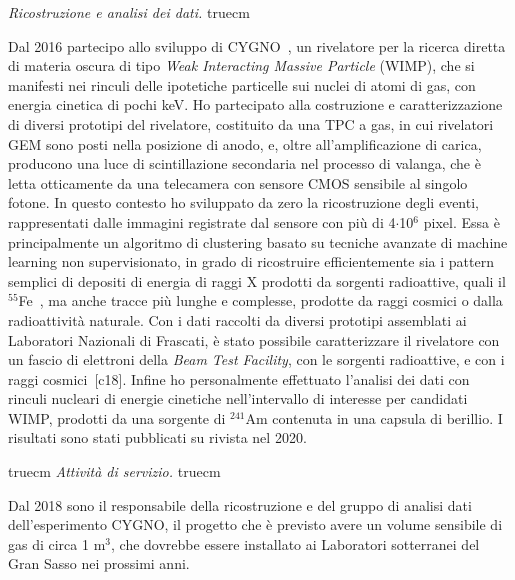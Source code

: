 \documentclass[11pt,twoside,a4paper]{article}
\begin{document}
\textit{Ricostruzione e analisi dei dati.}
 truecm

Dal 2016 partecipo allo sviluppo di CYGNO~\cite{Pinci:2019hhw}, un
rivelatore per la ricerca diretta di materia oscura di tipo
\textit{Weak Interacting Massive Particle} (WIMP), che si manifesti
nei rinculi delle ipotetiche particelle sui nuclei di atomi di gas,
con energia cinetica di pochi keV. Ho partecipato alla costruzione e
caratterizzazione di diversi prototipi del rivelatore, costituito da
una TPC a gas, in cui rivelatori GEM sono posti nella posizione di
anodo, e, oltre all'amplificazione di carica, producono una luce di
scintillazione secondaria nel processo di valanga, che \`e letta
otticamente da una telecamera con sensore CMOS sensibile al singolo
fotone.  In questo contesto ho sviluppato da zero la ricostruzione
degli eventi, rappresentati dalle immagini registrate dal sensore con
pi\`u di 4$\cdot$10$^6$ pixel.  Essa \`e principalmente un algoritmo
di clustering basato su tecniche avanzate di machine learning non
supervisionato, in grado di ricostruire efficientemente sia i pattern
semplici di depositi di energia di raggi X prodotti da sorgenti
radioattive, quali il $^{55}$Fe~\cite{Costa_2019}, ma anche tracce
pi\`u lunghe e complesse, prodotte da raggi cosmici o dalla
radioattivit\`a naturale.  Con i dati raccolti da diversi prototipi
assemblati ai Laboratori Nazionali di Frascati, \`e stato possibile
caratterizzare il rivelatore con un fascio di elettroni della
\textit{Beam Test Facility}, con le sorgenti radioattive, e con i
raggi cosmici~[c18]. Infine ho personalmente effettuato l'analisi dei
dati con rinculi nucleari di energie cinetiche nell'intervallo di
interesse per candidati WIMP, prodotti da una sorgente di $^{241}$Am
contenuta in una capsula di berillio. I risultati sono stati
pubblicati su rivista nel 2020.

 truecm
\textit{Attivit\`a di servizio.}
 truecm

Dal 2018 sono il responsabile della ricostruzione e del gruppo di
analisi dati dell'esperimento CYGNO, il progetto che \`e previsto
avere un volume sensibile di gas di circa 1 m$^3$, che dovrebbe essere
installato ai Laboratori sotterranei del Gran Sasso nei prossimi anni.

\clearpage

\nocite{*}


\end{document}
